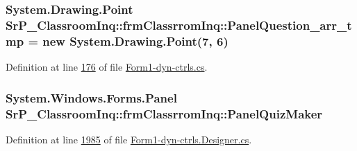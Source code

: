 \hypertarget{class_sr_p___classroom_inq_1_1frm_classrrom_inq_a3e546b9b0c603a788d0316efe572c960}{
\subsubsection[{\-Panel\-Question\-\_\-arr\-\_\-tmp}]{\setlength{\rightskip}{0pt plus 5cm}\-System.\-Drawing.\-Point {\bf \-Sr\-P\-\_\-\-Classroom\-Inq\-::frm\-Classrrom\-Inq\-::\-Panel\-Question\-\_\-arr\-\_\-tmp} = new \-System.\-Drawing.\-Point(7, 6)}}
\label{class_sr_p___classroom_inq_1_1frm_classrrom_inq_a3e546b9b0c603a788d0316efe572c960}


\-Definition at line \hyperlink{_form1-dyn-ctrls_8cs_source_l00176}{176} of file \hyperlink{_form1-dyn-ctrls_8cs_source}{\-Form1-\/dyn-\/ctrls.\-cs}.

\hypertarget{class_sr_p___classroom_inq_1_1frm_classrrom_inq_a1dd9af4cd0caad174e59e9038dcb8868}{
\subsubsection[{\-Panel\-Quiz\-Maker}]{\setlength{\rightskip}{0pt plus 5cm}\-System.\-Windows.\-Forms.\-Panel {\bf \-Sr\-P\-\_\-\-Classroom\-Inq\-::frm\-Classrrom\-Inq\-::\-Panel\-Quiz\-Maker}}}
\label{class_sr_p___classroom_inq_1_1frm_classrrom_inq_a1dd9af4cd0caad174e59e9038dcb8868}


\-Definition at line \hyperlink{_form1-dyn-ctrls_8_designer_8cs_source_l01985}{1985} of file \hyperlink{_form1-dyn-ctrls_8_designer_8cs_source}{\-Form1-\/dyn-\/ctrls.\-Designer.\-cs}.

